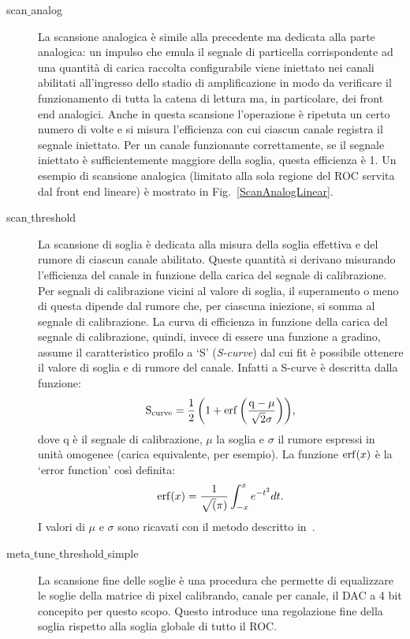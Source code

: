 \begin{description}
\item[scan$\_$analog] La scansione analogica \`e simile alla precedente ma dedicata alla parte analogica: un impulso che emula il segnale di particella corrispondente ad una quantit\`a di carica raccolta configurabile viene iniettato nei canali abilitati all'ingresso dello stadio di amplificazione in modo da verificare il funzionamento di tutta la catena di lettura ma, in particolare, dei front end analogici. Anche in questa scansione l'operazione \`e ripetuta un certo numero di volte e si misura l'efficienza con cui ciascun canale registra il segnale iniettato. Per un canale funzionante correttamente, se il segnale iniettato \`e sufficientemente maggiore della soglia, questa efficienza \`e 1. Un esempio di scansione analogica (limitato alla sola regione del ROC servita dal front end lineare) è mostrato in Fig.~\ref{ScanAnalogLinear}. %

\item[scan$\_$threshold] La scansione di soglia \`e dedicata alla misura della soglia effettiva e del rumore di ciascun canale abilitato. Queste quantit\`a si derivano misurando l'efficienza del canale in funzione della carica del segnale di calibrazione. Per segnali di calibrazione vicini al valore di soglia, il superamento o meno di questa dipende dal rumore che, per ciascuna iniezione, si somma al segnale di calibrazione. La curva di efficienza in funzione della carica del segnale di calibrazione, quindi, invece di essere una funzione a gradino, assume il caratteristico profilo a `S' ({\em S-curve}) dal cui fit \`e possibile ottenere il valore di soglia e di rumore del canale.
Infatti a S-curve è descritta dalla funzione:
\begin{equation}
  \mathrm{S_{curve} = \frac{1}{2} \left( 1 + \operatorname{erf} \left( \frac{q-\mu}{\sqrt{2}\sigma} \right) \right)},
\end{equation}
dove q \`e il segnale di calibrazione, $\mu$ la soglia e $\sigma$ il rumore espressi in unit\`a omogenee (carica equivalente, per esempio). La funzione $\operatorname{erf}(x)$ \`e la `error function' cos\`i definita:
\begin{equation}
 \operatorname{erf}(x) = \frac{1}{\sqrt(\pi)}\int_{-x}^{x} e^{-t^2}dt.
\end{equation}
I valori di $\mu$ e $\sigma$ sono ricavati con il metodo descritto in~\cite{ERF}.

\item[meta$\_$tune$\_$threshold$\_$simple] La scansione fine delle soglie \`e una procedura che permette di equalizzare le soglie della matrice di pixel calibrando, canale per canale, il DAC a 4 bit concepito per questo scopo. Questo introduce una regolazione fine della soglia rispetto alla soglia globale di tutto il ROC.
\end{description}


